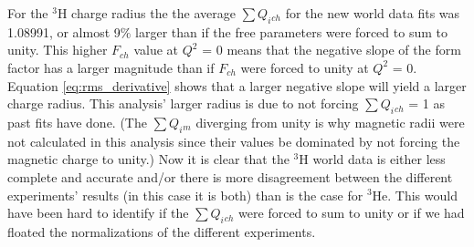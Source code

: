 For the $^3$H charge radius the the average $\sum Q_i{_{ch}}$ for the new world data fits was 1.08991, or almost 9$\%$ larger than if the free parameters were forced to sum to unity. This higher $F_{ch}$ value at $Q^2$ = 0 means that the negative slope of the form factor has a larger magnitude than if $F_{ch}$ were forced to unity at $Q^2$ = 0. Equation \ref{eq:rms_derivative} shows that a larger negative slope will yield a larger charge radius. This analysis' larger radius is due to not forcing $\sum Q_i{_{ch}}$ = 1 as past fits have done. (The $\sum Q_i{_m}$ diverging from unity is why magnetic radii were not calculated in this analysis since their values be dominated by not forcing the magnetic charge to unity.) Now it is clear that the $^3$H world data is either less complete and accurate and/or there is more disagreement between the different experiments' results (in this case it is both) than is the case for $^3$He. This would have been hard to identify if the $\sum Q_i{_{ch}}$ were forced to sum to unity or if we had floated the normalizations of the different experiments.

